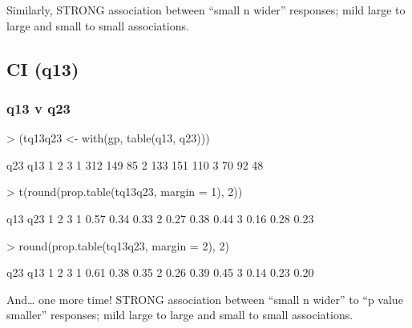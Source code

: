 \documentclass[11pt]{article}
\begin{document}
Similarly, STRONG association between ``small n wider'' responses; mild large to large and small to small associations.

\subsection{CI (q13)}
\label{sec-1-4}
\subsubsection{q13 v q23}
\label{sec-1-4-1}
\begin{Schunk}
\begin{Sinput}
> (tq13q23 <- with(gp, table(q13, q23)))
\end{Sinput}
\begin{Soutput}
   q23
q13   1   2   3
  1 312 149  85
  2 133 151 110
  3  70  92  48
\end{Soutput}
\begin{Sinput}
> t(round(prop.table(tq13q23, margin = 1), 2))
\end{Sinput}
\begin{Soutput}
   q13
q23    1    2    3
  1 0.57 0.34 0.33
  2 0.27 0.38 0.44
  3 0.16 0.28 0.23
\end{Soutput}
\begin{Sinput}
> round(prop.table(tq13q23, margin = 2), 2)
\end{Sinput}
\begin{Soutput}
   q23
q13    1    2    3
  1 0.61 0.38 0.35
  2 0.26 0.39 0.45
  3 0.14 0.23 0.20
\end{Soutput}
\end{Schunk}





And\ldots{} one more time! STRONG association between ``small n wider'' to ``p value smaller'' responses; mild large to large and small to small associations.
\end{document}

